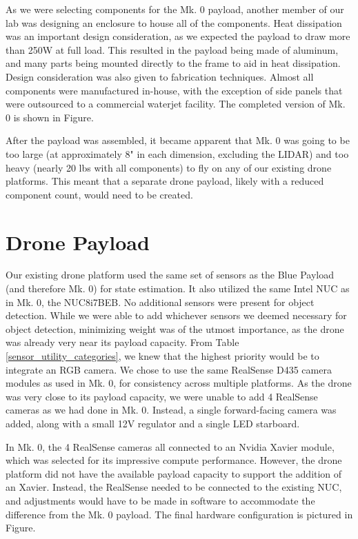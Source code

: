 As we were selecting components for the Mk. 0 payload, another member of our lab was designing an enclosure to house all of the components. Heat dissipation was an important design consideration, as we expected the payload to draw more than 250W at full load. This resulted in the payload being made of aluminum, and many parts being mounted directly to the frame to aid in heat dissipation. Design consideration was also given to fabrication techniques. Almost all components were manufactured in-house, with the exception of side panels that were outsourced to a commercial waterjet facility. The completed version of Mk. 0 is shown in Figure.

After the payload was assembled, it became apparent that Mk. 0 was going to be too large (at approximately 8" in each dimension, excluding the LIDAR) and too heavy (nearly 20 lbs with all components) to fly on any of our existing drone platforms. This meant that a separate drone payload, likely with a reduced component count, would need to be created.

\section{Drone Payload}

Our existing drone platform used the same set of sensors as the Blue Payload (and therefore Mk. 0) for state estimation. It also utilized the same Intel NUC as in Mk. 0, the NUC8i7BEB. No additional sensors were present for object detection. While we were able to add whichever sensors we deemed necessary for object detection, minimizing weight was of the utmost importance, as the drone was already very near its payload capacity. From Table \ref{sensor_utility_categories}, we knew that the highest priority would be to integrate an RGB camera. We chose to use the same RealSense D435 camera modules as used in Mk. 0, for consistency across multiple platforms. As the drone was very close to its payload capacity, we were unable to add 4 RealSense cameras as we had done in Mk. 0. Instead, a single forward-facing camera was added, along with a small 12V regulator and a single LED starboard.

In Mk. 0, the 4 RealSense cameras all connected to an Nvidia Xavier module, which was selected for its impressive compute performance. However, the drone platform did not have the available payload capacity to support the addition of an Xavier. Instead, the RealSense needed to be connected to the existing NUC, and adjustments would have to be made in software to accommodate the difference from the Mk. 0 payload. The final hardware configuration is pictured in Figure.

